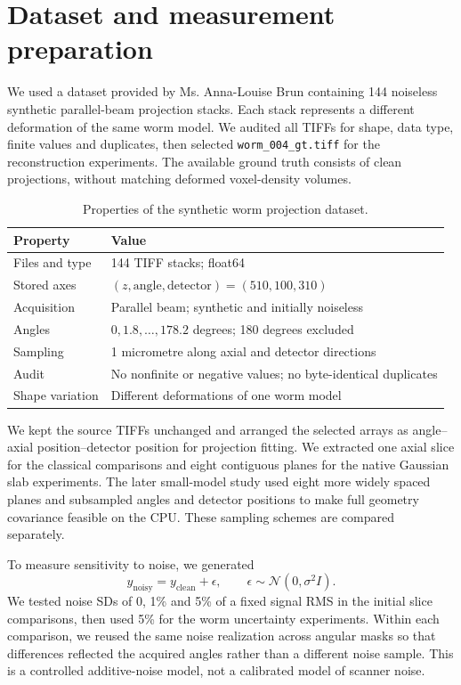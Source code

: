 \documentclass[11pt,a4paper]{article}
\begin{document}
\section{Dataset and measurement preparation}
We used a dataset provided by Ms. Anna-Louise Brun containing 144 noiseless synthetic parallel-beam projection stacks. Each stack represents a different deformation of the same worm model. We audited all TIFFs for shape, data type, finite values and duplicates, then selected \texttt{worm\_004\_gt.tiff} for the reconstruction experiments. The available ground truth consists of clean projections, without matching deformed voxel-density volumes.
\begin{table}[H]\centering\small
\caption{Properties of the synthetic worm projection dataset.}
\begin{tabularx}{\linewidth}{lX}\toprule
Property & Value\\\midrule
Files and type & 144 TIFF stacks; float64\\
Stored axes & $(z,\mathrm{angle},\mathrm{detector})=(510,100,310)$\\
Acquisition & Parallel beam; synthetic and initially noiseless\\
Angles & $0,1.8,\ldots,178.2$ degrees; 180 degrees excluded\\
Sampling & 1 micrometre along axial and detector directions\\
Audit & No nonfinite or negative values; no byte-identical duplicates\\
Shape variation & Different deformations of one worm model\\\bottomrule
\end{tabularx}\end{table}

We kept the source TIFFs unchanged and arranged the selected arrays as angle--axial position--detector position for projection fitting. We extracted one axial slice for the classical comparisons and eight contiguous planes for the native Gaussian slab experiments. The later small-model study used eight more widely spaced planes and subsampled angles and detector positions to make full geometry covariance feasible on the CPU. These sampling schemes are compared separately.

To measure sensitivity to noise, we generated
\begin{equation}
y_{\mathrm{noisy}}=y_{\mathrm{clean}}+\epsilon,\qquad\epsilon\sim\mathcal N(0,\sigma^2 I).
\end{equation}
We tested noise SDs of 0, 1\% and 5\% of a fixed signal RMS in the initial slice comparisons, then used 5\% for the worm uncertainty experiments. Within each comparison, we reused the same noise realization across angular masks so that differences reflected the acquired angles rather than a different noise sample. This is a controlled additive-noise model, not a calibrated model of scanner noise.
\end{document}
